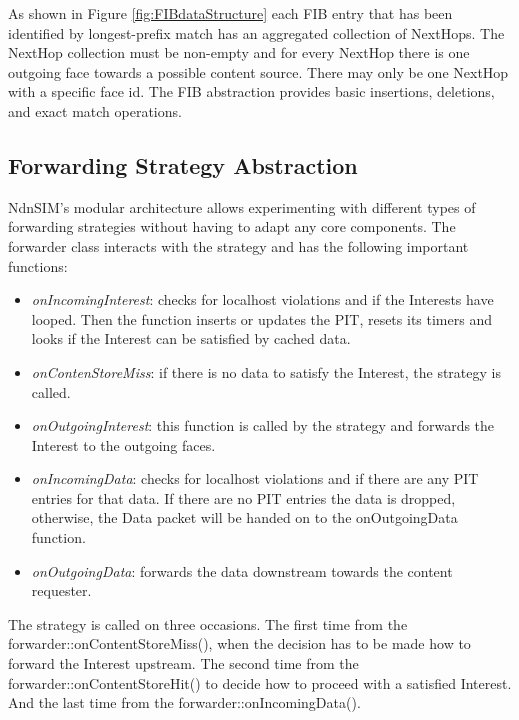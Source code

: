\vspace{5mm} %

As shown in Figure \ref{fig:FIBdataStructure} each FIB entry that has been identified by longest-prefix match has an aggregated collection of NextHops. The NextHop collection must be non-empty and for every NextHop there is one outgoing face towards a possible content source. There may only be one NextHop with a specific face id. The FIB abstraction provides basic insertions, deletions, and exact match operations.

\subsection{Forwarding Strategy Abstraction}

NdnSIM's modular architecture allows experimenting with different types of forwarding strategies without having to adapt any core components. The forwarder class interacts with the strategy and has the following important functions:

\begin{itemize}
\item \emph{onIncomingInterest}: checks for localhost violations and if the Interests have looped. Then the function inserts or updates the PIT, resets its timers and looks if the Interest can be satisfied by cached data.
\item \emph{onContenStoreMiss}: if there is no data to satisfy the Interest, the strategy is called.
\item \emph{onOutgoingInterest}: this function is called by the strategy and forwards the Interest to the outgoing faces.
\item \emph{onIncomingData}: checks for localhost violations and if there are any PIT entries for that data. If there are no PIT entries the data is dropped, otherwise, the Data packet will be handed on to the onOutgoingData function.
\item \emph{onOutgoingData}: forwards the data downstream towards the content requester.
\end{itemize}


The strategy is called on three occasions. The first time from the forwarder::onContentStoreMiss(), when the decision has to be made how to forward the Interest upstream. The second time from the forwarder::onContentStoreHit() to decide how to proceed with a satisfied Interest. And the last time from the forwarder::onIncomingData().

\vspace{5mm} %

